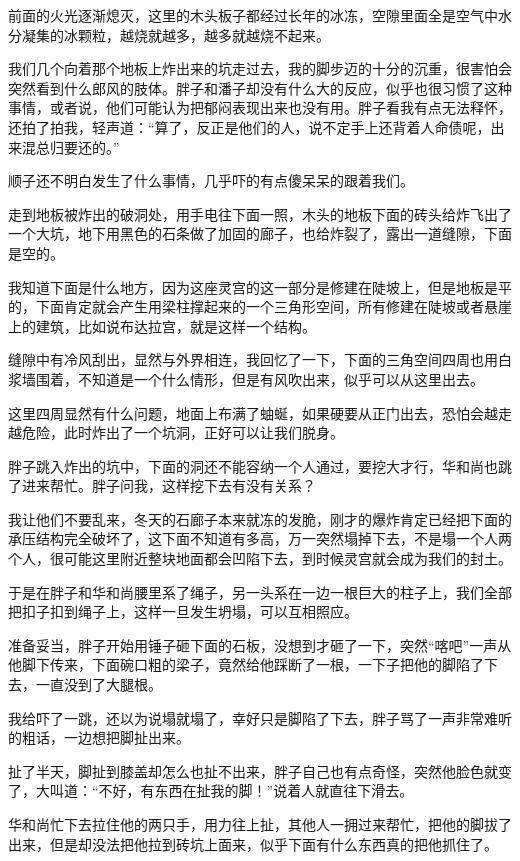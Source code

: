 前面的火光逐渐熄灭，这里的木头板子都经过长年的冰冻，空隙里面全是空气中水分凝集的冰颗粒，越烧就越多，越多就越烧不起来。

我们几个向着那个地板上炸出来的坑走过去，我的脚步迈的十分的沉重，很害怕会突然看到什么郎风的肢体。胖子和潘子却没有什么大的反应，似乎也很习惯了这种事情，或者说，他们可能认为把郁闷表现出来也没有用。胖子看我有点无法释怀，还拍了拍我，轻声道：“算了，反正是他们的人，说不定手上还背着人命债呢，出来混总归要还的。”

顺子还不明白发生了什么事情，几乎吓的有点傻呆呆的跟着我们。

走到地板被炸出的破洞处，用手电往下面一照，木头的地板下面的砖头给炸飞出了一个大坑，地下用黑色的石条做了加固的廊子，也给炸裂了，露出一道缝隙，下面是空的。

我知道下面是什么地方，因为这座灵宫的这一部分是修建在陡坡上，但是地板是平的，下面肯定就会产生用梁柱撑起来的一个三角形空间，所有修建在陡坡或者悬崖上的建筑，比如说布达拉宫，就是这样一个结构。

缝隙中有冷风刮出，显然与外界相连，我回忆了一下，下面的三角空间四周也用白浆墙围着，不知道是一个什么情形，但是有风吹出来，似乎可以从这里出去。

这里四周显然有什么问题，地面上布满了蚰蜒，如果硬要从正门出去，恐怕会越走越危险，此时炸出了一个坑洞，正好可以让我们脱身。

胖子跳入炸出的坑中，下面的洞还不能容纳一个人通过，要挖大才行，华和尚也跳了进来帮忙。胖子问我，这样挖下去有没有关系？

我让他们不要乱来，冬天的石廊子本来就冻的发脆，刚才的爆炸肯定已经把下面的承压结构完全破坏了，这下面不知道有多高，万一突然塌掉下去，不是塌一个人两个人，很可能这里附近整块地面都会凹陷下去，到时候灵宫就会成为我们的封土。

于是在胖子和华和尚腰里系了绳子，另一头系在一边一根巨大的柱子上，我们全部把扣子扣到绳子上，这样一旦发生坍塌，可以互相照应。

准备妥当，胖子开始用锤子砸下面的石板，没想到才砸了一下，突然“喀吧”一声从他脚下传来，下面碗口粗的梁子，竟然给他踩断了一根，一下子把他的脚陷了下去，一直没到了大腿根。

我给吓了一跳，还以为说塌就塌了，幸好只是脚陷了下去，胖子骂了一声非常难听的粗话，一边想把脚扯出来。

扯了半天，脚扯到膝盖却怎么也扯不出来，胖子自己也有点奇怪，突然他脸色就变了，大叫道：“不好，有东西在扯我的脚！”说着人就直往下滑去。

华和尚忙下去拉住他的两只手，用力往上扯，其他人一拥过来帮忙，把他的脚拔了出来，但是却没法把他拉到砖坑上面来，似乎下面有什么东西真的把他抓住了。

